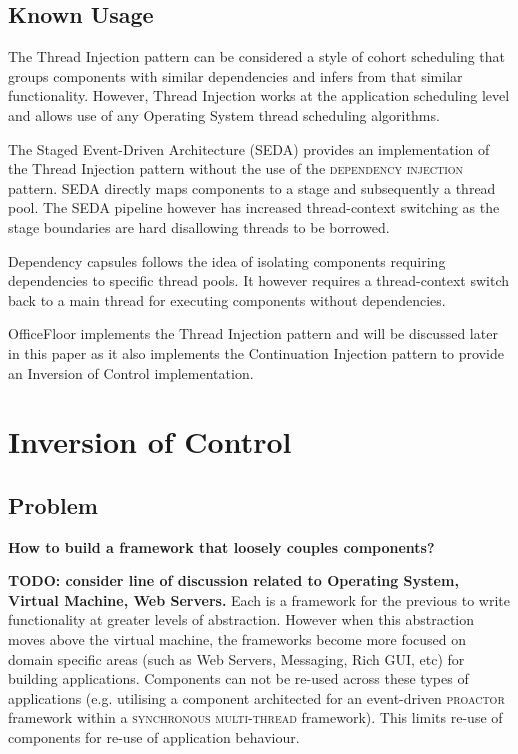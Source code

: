 \documentclass[prodmode]{style/acmlarge}
\begin{document}
\subsection{Known Usage}

The Thread Injection pattern can be considered a style of cohort scheduling
\cite{cohort} that groups components with similar dependencies and infers from
that similar functionality.  However, Thread Injection works at the application
scheduling level and allows use of any Operating System thread scheduling
algorithms.

The Staged Event-Driven Architecture (SEDA) \cite{seda} provides an
implementation of the Thread Injection pattern without the use of the
\textsc{dependency injection} pattern.  SEDA directly maps components to a stage
and subsequently a thread pool.  The SEDA pipeline however has increased
thread-context switching as the stage boundaries are hard disallowing threads to
be borrowed.

Dependency capsules \cite{dependency-capsules} follows the idea of isolating
components requiring dependencies to specific thread pools.  It however requires
a thread-context switch back to a main thread for executing components without
dependencies.

OfficeFloor \cite{officefloor} implements the Thread Injection pattern and will
be discussed later in this paper as it also implements the Continuation
Injection pattern to provide an Inversion of Control implementation.



\section{Inversion of Control}


\subsection{Problem}

\textbf{How to build a framework that loosely couples components?}

\textbf{TODO: consider line of discussion related to Operating System, Virtual
Machine, Web Servers.} Each is a framework for the previous to write
functionality at greater levels of abstraction.  However when this abstraction
moves above the virtual machine, the frameworks become more focused on domain
specific areas (such as Web Servers, Messaging, Rich GUI, etc) for building
applications.  Components can not be re-used across these types of applications
(e.g. utilising a component architected for an event-driven \textsc{proactor}
framework within a \textsc{synchronous multi-thread} framework).  This limits
re-use of components for re-use of application behaviour.
\end{document}
